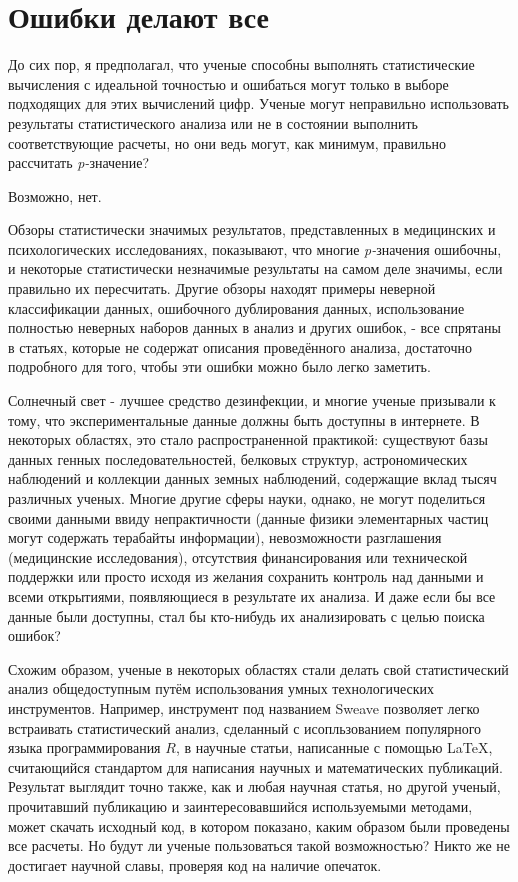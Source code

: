 \chapter{Ошибки делают все}
\label{chp9}

До сих пор, я предполагал, что ученые способны выполнять статистические вычисления с идеальной точностью и ошибаться могут только в выборе подходящих для этих вычислений цифр. Ученые могут неправильно использовать результаты статистического анализа или не в состоянии выполнить соответствующие расчеты, но они ведь могут, как минимум, правильно рассчитать \emph{p-}значение?

Возможно, нет. 

Обзоры статистически значимых результатов, представленных в медицинских и психологических исследованиях, показывают, что многие \emph{p-}значения ошибочны, и некоторые статистически незначимые результаты на самом деле значимы, если правильно их пересчитать.\cite{gotzsche_believability_2006,bakker_misreporting_2011} Другие обзоры находят примеры неверной классификации данных, ошибочного дублирования данных, использование полностью неверных наборов данных в анализ и других ошибок, - все спрятаны в статьях, которые не содержат описания проведённого анализа, достаточно подробного для того, чтобы эти ошибки можно было легко заметить.\cite{baggerly_deriving_2009,gotzsche_methodology_1989} 

Солнечный свет - лучшее средство дезинфекции, и многие ученые призывали к тому, что экспериментальные данные должны быть доступны в интернете. В некоторых областях, это стало распространенной практикой: существуют базы данных генных последовательностей, белковых структур, астрономических наблюдений и коллекции данных земных наблюдений, содержащие вклад тысяч различных ученых. Многие другие сферы науки, однако, не могут поделиться своими данными ввиду непрактичности (данные физики элементарных частиц могут содержать терабайты информации), невозможности разглашения (медицинские исследования), отсутствия финансирования или технической поддержки или просто исходя из желания сохранить контроль над данными и всеми открытиями, появляющиеся в результате их анализа. И даже если бы все данные были доступны, стал бы кто-нибудь их анализировать с целью поиска ошибок?   

Схожим образом, ученые в некоторых областях стали делать свой статистический анализ общедоступным путём использования умных технологических инструментов. Например, инструмент под названием Sweave позволяет легко встраивать статистический анализ, сделанный с исопльзованием популярного языка программирования $R$, в научные статьи, написанные с помощью \LaTeX, считающийся стандартом для написания научных и математических публикаций. Результат выглядит точно также, как и любая научная статья, но другой ученый, прочитавший публикацию и заинтересовавшийся используемыми методами, может скачать исходный код, в котором показано, каким образом были проведены все расчеты. Но будут ли ученые пользоваться такой возможностью? Никто же не достигает научной славы, проверяя код на наличие опечаток.

